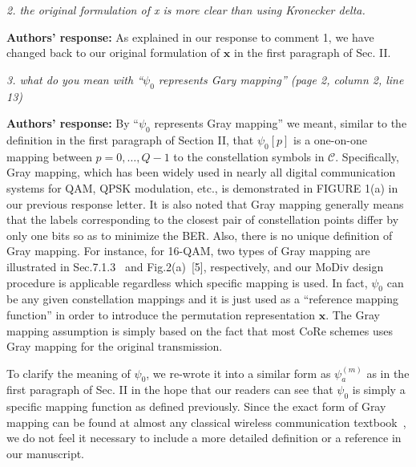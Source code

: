 \documentclass[onecolumn, 11pt, draftclsnofoot]{IEEEtran}
\begin{document}
\vspace{0.5cm}

\noindent
\emph{2. the original formulation of x is more clear than using Kronecker delta.
}

\noindent \textbf{Authors' response:}
As explained in our response to comment 1, we have changed back to our original
formulation of $\mathbf{x}$ in the first paragraph of Sec. II.

\vspace{0.5cm}

\noindent
\emph{3. what do you mean with ``$\psi_0$ represents Gary mapping'' (page 2,
column 2, line 13)}

\noindent \textbf{Authors' response:}
By ``$\psi_0$ represents Gray mapping'' we meant, similar to the definition in
the first paragraph of Section II, that $\psi_0[p]$ is a one-on-one mapping
between $p=0,\ldots,Q-1$ to the constellation symbols in $\mathcal{C}$.
Specifically, Gray mapping, which has been widely used in nearly all digital
communication systems for QAM, QPSK modulation, etc., is demonstrated in FIGURE
1(a) in our previous response letter. It is also noted that Gray mapping
generally means that the labels corresponding to the closest pair of
constellation points differ by only one bits so as to minimize the BER. Also,
there is no unique definition of Gray mapping. For instance, for 16-QAM, two
types of Gray mapping are illustrated in Sec.7.1.3~\citep[R][]{TS36.211} and
Fig.2(a)~[5], respectively, and our MoDiv design procedure is applicable
regardless which specific mapping is used. In fact, $\psi_0$ can be any given
constellation mappings and it is just used as a ``reference mapping function''
in order to introduce the permutation representation $\mathbf{x}$.
The Gray mapping assumption is simply based on the fact that most CoRe schemes
uses Gray mapping for the original transmission.

To clarify the meaning of $\psi_0$, we re-wrote it into a similar form as
$\psi_a^{(m)}$ as in the first paragraph of Sec. II in the hope that our readers
can see that $\psi_0$ is simply a specific mapping function as defined
previously.
Since the exact form of Gray mapping can be found at almost any classical
wireless communication
textbook~\citep[R][]{proakisdigital,molisch2007wireless,goldsmith2005wireless},
we do not feel it necessary to include a more detailed definition or a reference in our manuscript.
\end{document}
